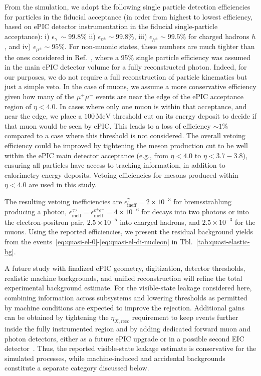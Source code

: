 \documentclass[aps,prd,preprintnumbers,superscriptaddress,nofootinbib,floatfix,twocolumn,notitlepage,reprint]{revtex4-2}
\newcommand{\MeV}{\mathrm{MeV}}
\begin{document}
From the simulation, we adopt the following single particle detection efficiencies for particles in the fiducial acceptance (in order from highest to lowest efficiency, based on ePIC detector instrumentation in the fiducial single-particle acceptance): 
i) $\epsilon_{\gamma} ~\sim 99.8\%$ 
ii) $\epsilon_{e^{\pm}} \sim 99.8\%$, 
iii) $\epsilon_{h^{\pm}} \sim 99.5\%$ for charged hadrons $h$, 
and iv) $\epsilon_{\mu^{\pm}} \sim 95\%$. 
For non-muonic states, these numbers are much tighter than the ones considered in Ref.~\cite{dvcs2025}, where a 95\% single particle efficiency was assumed in the main ePIC detector volume for a fully reconstructed photon. 
Indeed, for our purposes, we do not require a full reconstruction of particle kinematics but just a simple veto. 
In the case of muons, we assume a more conservative efficiency given how many of the $\mu^{+}\mu^{-}$ events are near the edge of the ePIC acceptance region of $\eta < 4.0$. 
In cases where only one muon is within that acceptance, and near the edge, we place a $100\,\MeV$ threshold cut on its energy deposit to decide if that muon would be seen by ePIC. 
This leads to a loss of efficiency $\sim 1\%$ compared to a case where this threshold is not considered. 
The overall vetoing efficiency could be improved by tightening the meson production cut to be well within the ePIC main detector acceptance (e.g., from $\eta < 4.0$ to $\eta < 3.7-3.8$), ensuring all particles have access to tracking information, in addition to calorimetry energy deposits. Vetoing efficiencies for mesons produced within $\eta < 4.0$ are used in this study.

The resulting vetoing inefficiencies are $\epsilon^{\gamma}_{\text{ineff}} = 2\times 10^{-3}$ for bremsstrahlung producing a photon, $\epsilon^{\gamma\gamma}_{\text{ineff}}=\epsilon^{e^{+}e^{-}}_{\text{ineff}} = 4\times 10^{-6}$ for decays into two photons or into the electron-positron pair, $2.5\times 10^{-5}$ into charged hadrons, and $2.5\times 10^{-3}$ for the muons. Using the reported efficiencies, we present the residual background yields from the events~\eqref{eq:quasi-el-0}-\eqref{eq:quasi-el-di-nucleon} in Tbl.~\ref{tab:quasi-elastic-bg}. 

A future study with finalized ePIC geometry, digitization, detector thresholds, realistic machine backgrounds, and unified reconstruction will refine the total experimental background estimate.
For the visible-state leakage considered here, combining information across subsystems and lowering thresholds as permitted by machine conditions are expected to improve the rejection.
Additional gains can be obtained by tightening the $\eta_{X,\text{reco}}$ requirement to keep events further inside the fully instrumented region and by adding dedicated forward muon and photon detectors, either as a future ePIC upgrade or in a possible second EIC detector~\cite{NADEL-TURONSKI:2024/c}.
Thus, the reported visible-state leakage estimate is conservative for the simulated processes, while machine-induced and accidental backgrounds constitute a separate category discussed below.
\end{document}
